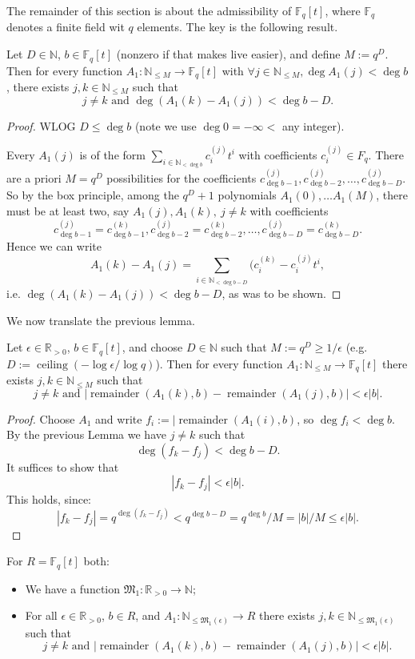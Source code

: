 \documentclass{amsart}
\newcommand{\N}{\mathbb{N}}
\newcommand{\R}{\mathbb{R}}
\newcommand{\F}{\mathbb{F}}
\newcommand{\M}{\mathfrak{M}}
\newcommand{\remainder}{\operatorname{remainder}}
\begin{document}
The remainder of this section is about the admissibility of $\F_q[t]$, where $\F_q$ denotes a finite field wit $q$ elements.
The key is the following result.

\begin{lemma}
Let $D \in \N$, $b \in \F_q[t]$ (nonzero if that makes live easier), and define $M:=q^D$. Then for every function
$A_1: \N_{\leq M} \to \F_q[t]$ with $\forall j \in  \N_{\leq M}, \deg A_1(j) < \deg b$, there exists $j,k \in \N_{\leq M}$ such that
\[j \neq k \text{ and } \deg(A_1(k)-A_1(j)) < \deg b-D.\]
\end{lemma}

\begin{proof}
WLOG $D \leq \deg b$ (note we use $\deg 0 = -\infty < $ any integer).

Every $A_1(j)$ is of the form $\sum_{i \in \N_{< \deg b}} c_i^{(j)} t^i$ with coefficients $c_i^{(j)} \in F_q$.
There are a priori $M=q^D$ possibilities for the coefficients $c_{\deg b-1}^{(j)}, c_{\deg b-2}^{(j)},\ldots, c_{\deg b-D}^{(j)}$.
So by the box principle, among the $q^D+1$ polynomials $A_1(0), \ldots A_1(M)$, there must be at least two, say $A_1(j), A_1(k),\ j\not=k$ with coefficients 
\[c_{\deg b-1}^{(j)}=c_{\deg b-1}^{(k)}, c_{\deg b-2}^{(j)}= c_{\deg b-2}^{(k)},\ldots, c_{\deg b-D}^{(j)}= c_{\deg b-D}^{(k)}.\] Hence we can write
 \[A_1(k)-A_1(j)=\sum_{i \in \N_{<\deg b-D}} (c_i^{(k)}-c_i^{(j)} t^i,\]
i.e. $\deg (A_1(k)-A_1(j))<\deg b-D$, as was to be shown.
\end{proof}

We now translate the previous lemma.
\begin{lemma}
Let $\epsilon \in \R_{>0}$, $b \in \F_q[t]$, and choose $D \in \N$ such that $M:=q^D\geq 1/\epsilon$ (e.g. $D:=\operatorname{ceiling} (-\log \epsilon/\log q)$).
Then for every function
$A_1: \N_{\leq M} \to \F_q[t]$ there exists $j,k \in \N_{\leq M}$ such that
\[j \neq k \text{ and } |\remainder(A_1(k),b)-\remainder(A_1(j),b)| < \epsilon |b|.\]
\end{lemma}

\begin{proof}
Choose $A_1$ and write $f_i:= |\remainder(A_1(i),b)$, so $\deg f_i < \deg b$. By the previous Lemma we have $j\not=k$ such that
\[\deg (f_k-f_j) <\deg b -D.\]
It suffices to show that
\[|f_k-f_j| <\epsilon |b|.\]
This holds, since:
\[ |f_k-f_j|=q^{\deg(f_k-f_j)}<q^{\deg b -D}=q^{\deg b}/M=|b|/M\leq \epsilon |b|.\]
\end{proof}


\begin{lemma}\label{lem admissible 1D}
For $R=\F_q[t]$ both:
\begin{itemize}
\item We have a function $\M_1 : \R_{>0} \to \N$;
\item For all $ \epsilon \in \R_{>0}$, $b \in R$, and $A_1: \N_{\leq \M_1(\epsilon)} \to R$ there exists $j,k \in \N_{\leq \M_1(\epsilon)}$ such that
\[j \neq k \text{ and } |\remainder(A_1(k),b)-\remainder(A_1(j),b)| < \epsilon |b|.\]
\end{itemize}
\end{lemma}
\end{document}
